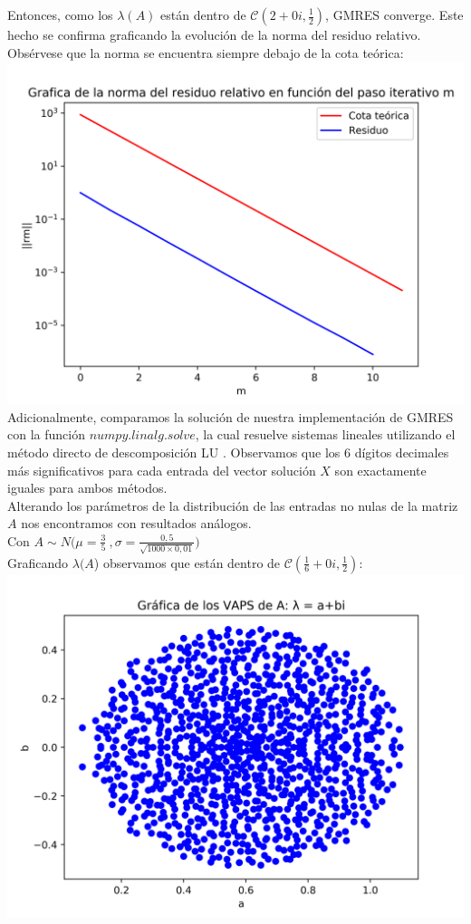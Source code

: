 \documentclass{endm}
\begin{document}
Entonces, como los $\lambda(A)$ están dentro de $\mathscr{C}(2+0i,\frac{1}{2})$, GMRES converge. Este hecho se confirma graficando la evolución de la norma del residuo relativo. Obsérvese que la norma se encuentra siempre debajo de la cota teórica:
\includegraphics[scale = 0.7]{residuo.png}\\

Adicionalmente, comparamos la solución de nuestra implementación de GMRES con la función $numpy.linalg.solve$, la cual resuelve sistemas lineales utilizando el método directo de descomposición 
LU\cite{linalg} . Observamos que los 6 dígitos decimales más significativos para cada entrada del vector solución $X$ son exactamente iguales para ambos métodos. \\

Alterando los parámetros de la distribución de las entradas no nulas de la matriz $A$ nos encontramos con resultados análogos.\\
Con $A \sim N \Bigg(\mu=\frac{3}{5} \ ,\sigma=\frac{0,5}{\sqrt{1000 \times 0,01}}\Bigg)$ \\
Graficando $\lambda(A$) observamos que están dentro de $\mathscr{C}(\frac{1}{6}+0i,\frac{1}{2})$:
\includegraphics[scale = 0.7]{vaps-5a.png}\\
\end{document}
